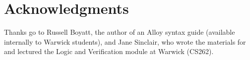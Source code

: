 \documentclass[10pt]{article}
\begin{document}
  \section*{Acknowledgments}
    Thanks go to Russell Boyatt, the author of an Alloy syntax guide (available internally to Warwick students), and Jane Sinclair, who wrote the materials for and lectured the Logic and Verification module at Warwick (CS262).
\end{document}
